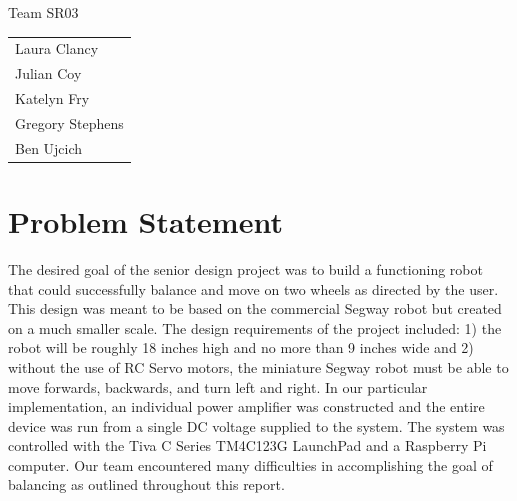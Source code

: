 \documentclass[11pt]{report}
\begin{document}
\begin{spacing}{1.5}

\thispagestyle{empty}

\vspace*{72pt}
{
\huge
\begin{center}
    \reporttitle
\end{center}
}
\vspace{72pt}

{
\huge
\begin{center}
  Team SR03
\end{center}
}

{
\Large 
\begin{center}
  \begin{tabular}{l}
    Laura Clancy \\
    Julian Coy \\
    Katelyn Fry \\
    Gregory Stephens \\
    Ben Ujcich
  \end{tabular}
\end{center}
}

\clearpage
\setcounter{page}{1}





\section*{Problem Statement} %

The desired goal of the senior design project was to build a functioning robot that could successfully balance and move on two wheels as directed by the user. This design was meant to be based on the commercial Segway robot but created on a much smaller scale. The design requirements of the project included: 1) the robot will be roughly 18 inches high and no more than 9 inches wide and 2) without the use of RC Servo motors, the miniature Segway robot must be able to move forwards, backwards, and turn left and right. In our particular implementation, an individual power amplifier was constructed and the entire device was run from a single DC voltage supplied to the system. The system was controlled with the Tiva C Series TM4C123G LaunchPad and a Raspberry Pi computer. Our team encountered many difficulties in accomplishing the goal of balancing as outlined throughout this report.


\end{spacing}
\end{document}
